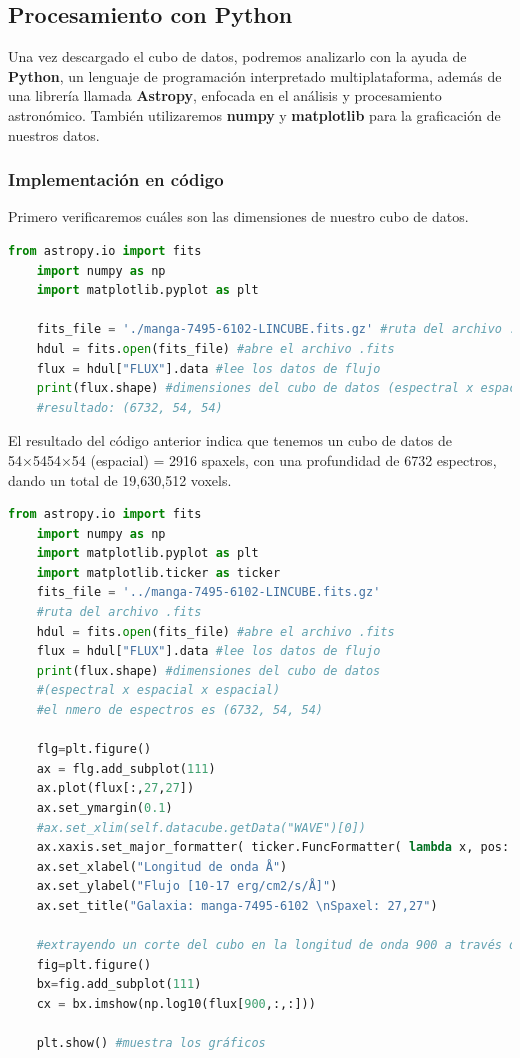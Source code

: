 \documentclass[10pt,twocolumn,a4paper]{opticajnl}
\begin{document}
\subsection*{Procesamiento con Python}

Una vez descargado el cubo de datos, podremos analizarlo con la ayuda de \textbf{Python}, un lenguaje de programación interpretado multiplataforma, además de una librería llamada \textbf{Astropy}, enfocada en el análisis y procesamiento astronómico. También utilizaremos \textbf{numpy} y \textbf{matplotlib} para la graficación de nuestros datos.

\subsubsection*{Implementación en código}

Primero verificaremos cuáles son las dimensiones de nuestro cubo de datos.

\begin{lstlisting}[language=Python]
    from astropy.io import fits
    import numpy as np
    import matplotlib.pyplot as plt
    
    fits_file = './manga-7495-6102-LINCUBE.fits.gz' #ruta del archivo .fits
    hdul = fits.open(fits_file) #abre el archivo .fits
    flux = hdul["FLUX"].data #lee los datos de flujo
    print(flux.shape) #dimensiones del cubo de datos (espectral x espacial x espacial)
    #resultado: (6732, 54, 54)
\end{lstlisting}

El resultado del código anterior indica que tenemos un cubo de datos de 54×5454×54 (espacial) = 2916 spaxels, con una profundidad de 6732 espectros, dando un total de 19,630,512 voxels.
\begin{lstlisting}[language=Python]
    from astropy.io import fits
    import numpy as np
    import matplotlib.pyplot as plt
    import matplotlib.ticker as ticker
    fits_file = '../manga-7495-6102-LINCUBE.fits.gz'
    #ruta del archivo .fits
    hdul = fits.open(fits_file) #abre el archivo .fits
    flux = hdul["FLUX"].data #lee los datos de flujo
    print(flux.shape) #dimensiones del cubo de datos
    #(espectral x espacial x espacial)
    #el nmero de espectros es (6732, 54, 54)
    
    flg=plt.figure()
    ax = flg.add_subplot(111)
    ax.plot(flux[:,27,27])
    ax.set_ymargin(0.1)
    #ax.set_xlim(self.datacube.getData("WAVE")[0])
    ax.xaxis.set_major_formatter( ticker.FuncFormatter( lambda x, pos: '{}{}'.format('', str(int(x)+self.datacube.getData("WAVE")[0]))))
    ax.set_xlabel("Longitud de onda Å")
    ax.set_ylabel("Flujo [10-17 erg/cm2/s/Å]")
    ax.set_title("Galaxia: manga-7495-6102 \nSpaxel: 27,27") 
    
    #extrayendo un corte del cubo en la longitud de onda 900 a través de toda la imagen y aplicando log10 - devuelve una imagen  
    fig=plt.figure()
    bx=fig.add_subplot(111) 
    cx = bx.imshow(np.log10(flux[900,:,:]))
    
    plt.show() #muestra los gráficos
\end{lstlisting}
\end{document}
